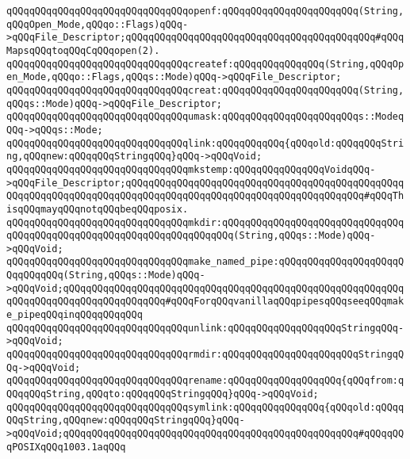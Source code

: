 \newline
\verb|qQQqqQQqqQQqqQQqqQQqqQQqqQQqqQQqopenf:qQQqqQQqqQQqqQQqqQQqqQQq(String,qQQqOpen_Mode,qQQqo::Flags)qQQq->qQQqFile_Descriptor;qQQqqQQqqQQqqQQqqQQqqQQqqQQqqQQqqQQqqQQqqQQq#qQQqMapsqQQqtoqQQqCqQQqopen(2).|\newline
\verb|qQQqqQQqqQQqqQQqqQQqqQQqqQQqqQQqcreatef:qQQqqQQqqQQqqQQq(String,qQQqOpen_Mode,qQQqo::Flags,qQQqs::Mode)qQQq->qQQqFile_Descriptor;|\newline
\verb|qQQqqQQqqQQqqQQqqQQqqQQqqQQqqQQqcreat:qQQqqQQqqQQqqQQqqQQqqQQq(String,qQQqs::Mode)qQQq->qQQqFile_Descriptor;|\newline
\verb|qQQqqQQqqQQqqQQqqQQqqQQqqQQqqQQqumask:qQQqqQQqqQQqqQQqqQQqqQQqs::ModeqQQq->qQQqs::Mode;|\newline
\verb|qQQqqQQqqQQqqQQqqQQqqQQqqQQqqQQqlink:qQQqqQQqqQQq{qQQqold:qQQqqQQqString,qQQqnew:qQQqqQQqStringqQQq}qQQq->qQQqVoid;|\newline
\newline
\verb|qQQqqQQqqQQqqQQqqQQqqQQqqQQqqQQqmkstemp:qQQqqQQqqQQqqQQqVoidqQQq->qQQqFile_Descriptor;qQQqqQQqqQQqqQQqqQQqqQQqqQQqqQQqqQQqqQQqqQQqqQQqqQQqqQQqqQQqqQQqqQQqqQQqqQQqqQQqqQQqqQQqqQQqqQQqqQQqqQQqqQQqqQQq#qQQqThisqQQqmayqQQqnotqQQqbeqQQqposix.|\newline
\newline
\verb|qQQqqQQqqQQqqQQqqQQqqQQqqQQqqQQqmkdir:qQQqqQQqqQQqqQQqqQQqqQQqqQQqqQQqqQQqqQQqqQQqqQQqqQQqqQQqqQQqqQQqqQQqqQQq(String,qQQqs::Mode)qQQq->qQQqVoid;|\newline
\verb|qQQqqQQqqQQqqQQqqQQqqQQqqQQqqQQqmake_named_pipe:qQQqqQQqqQQqqQQqqQQqqQQqqQQqqQQq(String,qQQqs::Mode)qQQq->qQQqVoid;qQQqqQQqqQQqqQQqqQQqqQQqqQQqqQQqqQQqqQQqqQQqqQQqqQQqqQQqqQQqqQQqqQQqqQQqqQQqqQQqqQQqqQQq#qQQqForqQQqvanillaqQQqpipesqQQqseeqQQqmake_pipeqQQqinqQQqqQQqqQQq|\newline
\newline
\verb|qQQqqQQqqQQqqQQqqQQqqQQqqQQqqQQqunlink:qQQqqQQqqQQqqQQqqQQqStringqQQq->qQQqVoid;|\newline
\verb|qQQqqQQqqQQqqQQqqQQqqQQqqQQqqQQqrmdir:qQQqqQQqqQQqqQQqqQQqqQQqStringqQQq->qQQqVoid;|\newline
\verb|qQQqqQQqqQQqqQQqqQQqqQQqqQQqqQQqrename:qQQqqQQqqQQqqQQqqQQq{qQQqfrom:qQQqqQQqString,qQQqto:qQQqqQQqStringqQQq}qQQq->qQQqVoid;|\newline
\verb|qQQqqQQqqQQqqQQqqQQqqQQqqQQqqQQqsymlink:qQQqqQQqqQQqqQQq{qQQqold:qQQqqQQqString,qQQqnew:qQQqqQQqStringqQQq}qQQq->qQQqVoid;qQQqqQQqqQQqqQQqqQQqqQQqqQQqqQQqqQQqqQQqqQQqqQQqqQQq#qQQqqQQqPOSIXqQQq1003.1aqQQq|\newline
